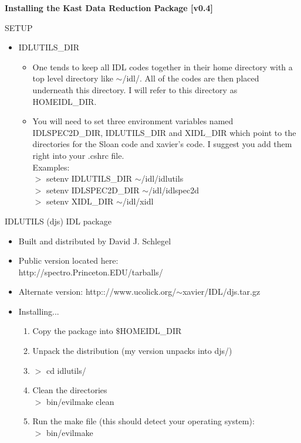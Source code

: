 \documentclass[11pt,letterpaper,dvips]{article}
\begin{document}
 

\begin{center}
{{\huge \bf Installing the Kast Data Reduction Package [v0.4]}}
\end{center}

\begin{enumerate}

{\Large   \item SETUP}
   \begin{itemize}
	\item IDLUTILS\_DIR
	\begin{itemize}
	  \item One tends to keep all IDL codes together in their home directory
		with a top level directory like $\sim$/idl/.  All of the codes
		are then placed underneath this directory.  I will refer to 
		this directory as HOMEIDL\_DIR.
	  \item You will need to set three environment variables 
	  named IDLSPEC2D\_DIR, IDLUTILS\_DIR and 
  	  XIDL\_DIR which point to the directories
	  for the Sloan code and xavier's code.  I suggest you add them
	  right into your .cshrc file. \\
	  \quad Examples: \\
	  \quad $>$ setenv IDLUTILS\_DIR $\sim$/idl/idlutils \\
	  \quad $>$ setenv IDLSPEC2D\_DIR $\sim$/idl/idlspec2d \\
	  \quad $>$ setenv XIDL\_DIR $\sim$/idl/xidl 
	\end{itemize}
   \end{itemize}
	

{\Large   \item IDLUTILS (djs) IDL package}
   \begin{itemize}
	\item Built and distributed by David J. Schlegel
	\item Public version located here: \\
	http://spectro.Princeton.EDU/tarballs/
	\item Alternate version:
	http:://www.ucolick.org/$\sim$xavier/IDL/djs.tar.gz
	\item Installing...
	\begin{enumerate}
	  \item Copy the package into $\$$HOMEIDL\_DIR
	  \item Unpack the distribution (my version unpacks into djs/)
	  \item $>$ cd idlutils/
	  \item Clean the directories \\
	  $>$ bin/evilmake clean
	  \item Run the make file (this should detect your operating system):  \\
	  $>$ bin/evilmake
	\end{enumerate}
   \end{itemize}


\end{enumerate}
\end{document}
